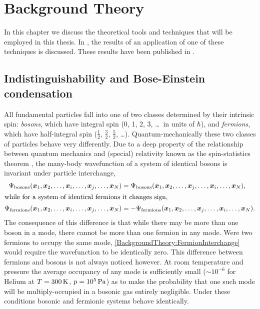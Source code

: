 \chapter{Background Theory}
\label{BackgroundTheory}
\graphicspath{{Figures/BackgroundTheory/}{Figures/Common/}}

In this chapter we discuss the theoretical tools and techniques that will be employed in this thesis.  In , the results of an application of one of these techniques is discussed.  These results have been published in \citet{Dall:2007}.

\section{Indistinguishability and Bose-Einstein condensation}

All fundamental particles fall into one of two classes determined by their intrinsic spin:  \emph{bosons}, which have integral spin (0, 1, 2, 3, \dots\ in units of $\hbar$), and \emph{fermions}, which have half-integral spin ($\frac{1}{2}$, $\frac{3}{2}$, $\frac{5}{2}$, \dots).  Quantum-mechanically these two classes of particles behave very differently.  Due to a deep property of the relationship between quantum mechanics and (special) relativity known as the spin-statistics theorem \citep{Fierz:1939}, the many-body wavefunction of a system of identical bosons is invariant under particle interchange,
\begin{align}
    \Psi_\text{bosons}(\vect{x}_1, \vect{x}_2, \dots, \vect{x}_i, \dots, \vect{x}_j, \dots, \vect{x}_N) &= \Psi_\text{bosons}(\vect{x}_1, \vect{x}_2, \dots, \vect{x}_j, \dots, \vect{x}_i, \dots, \vect{x}_N), \label{BackgroundTheory:BosonInterchange} \\
    \intertext{while for a system of identical fermions it changes sign,}
    \Psi_\text{fermions}(\vect{x}_1, \vect{x}_2, \dots, \vect{x}_i, \dots, \vect{x}_j, \dots, \vect{x}_N) &= -\Psi_\text{fermions}(\vect{x}_1, \vect{x}_2, \dots, \vect{x}_j, \dots, \vect{x}_i, \dots, \vect{x}_N). \label{BackgroundTheory:FermionInterchange}
\end{align}
The consequence of this difference is that while there may be more than one boson in a mode, there cannot be more than one fermion in any mode.  Were two fermions to occupy the same mode, \eqref{BackgroundTheory:FermionInterchange} would require the wavefunction to be identically zero.  This difference between fermions and bosons is not always noticed however.  At room temperature and pressure the average occupancy of any mode is sufficiently small ($\sim 10^{-6}$ for Helium at $T=\unit[300]{K}$, $p = \unit[10^5]{Pa}$) as to make the probability that one such mode will be multiply-occupied in a bosonic gas entirely negligible.  Under these conditions bosonic and fermionic systems behave identically.

